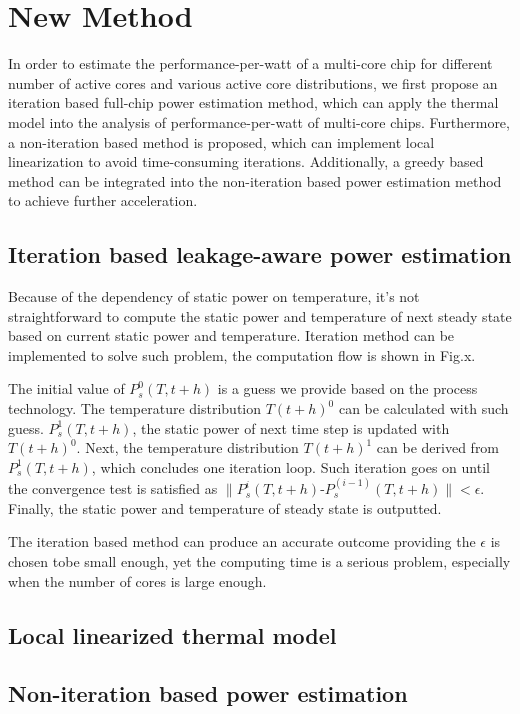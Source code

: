 \section{New Method}
In order to estimate the performance-per-watt of a multi-core chip for different number of 
active cores and various active core distributions, we first propose an iteration based 
full-chip power estimation method, which can apply the thermal model into the analysis of
performance-per-watt of multi-core chips. Furthermore, a non-iteration based method is 
proposed, which can implement local linearization to avoid time-consuming iterations. 
Additionally, a greedy based method can be integrated into the non-iteration based power
estimation method to achieve further acceleration.

\subsection{Iteration based leakage-aware power estimation}
Because of the dependency of static power on temperature, it's not straightforward to compute
the static power and temperature of next steady state based on current static power and 
temperature. Iteration method can be implemented to solve such problem, the computation flow 
is shown in Fig.x.

The initial value of $P^0_s(T,t+h)$ is a guess we provide based on the process technology.
The temperature distribution $T(t+h)^0$ can be calculated with such guess. $P^1_s(T,t+h)$,
the static power of next time step is updated with $T(t+h)^0$. Next, the temperature 
distribution $T(t+h)^1$ can be derived from $P^1_s(T,t+h)$, which concludes one iteration
loop. Such iteration goes on until the convergence test is satisfied as 
$\parallel P^i_s(T,t+h)$-$P^(i-1)_s(T,t+h)\parallel<\epsilon$. Finally, the static power and
temperature of steady state is outputted.

The iteration based method can produce an accurate outcome providing the $\epsilon$ is 
chosen tobe small enough, yet the computing time is a serious problem, especially when the
number of cores is large enough.

\subsection{Local linearized thermal model}


\subsection{Non-iteration based power estimation}

